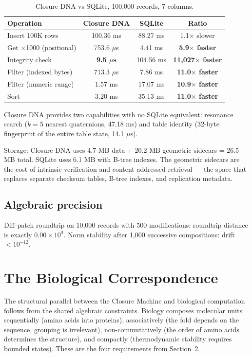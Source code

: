 \documentclass[12pt,a4paper]{article}
\begin{document}
\begin{table}[h]
\centering
\small
\begin{tabular}{@{}lccc@{}}
\toprule
Operation & Closure DNA & SQLite & Ratio \\
\midrule
Insert 100K rows & 100.36 ms & 88.27 ms & 1.1$\times$ slower \\
Get $\times$1000 (positional) & 753.6 $\mu$s & 4.41 ms & \textbf{5.9$\times$ faster} \\
Integrity check & \textbf{9.5 $\mu$s} & 104.56 ms & \textbf{11,027$\times$ faster} \\
Filter (indexed bytes) & 713.3 $\mu$s & 7.86 ms & \textbf{11.0$\times$ faster} \\
Filter (numeric range) & 1.57 ms & 17.07 ms & \textbf{10.9$\times$ faster} \\
Sort & 3.20 ms & 35.13 ms & \textbf{11.0$\times$ faster} \\
\bottomrule
\end{tabular}
\caption{Closure DNA vs SQLite, 100,000 records, 7 columns.}
\end{table}

Closure DNA provides two capabilities with no SQLite equivalent: resonance search ($k=5$ nearest quaternions, 47.18 ms) and table identity (32-byte fingerprint of the entire table state, 14.1 $\mu$s).

Storage: Closure DNA uses 4.7 MB data + 20.2 MB geometric sidecars = 26.5 MB total. SQLite uses 6.1 MB with B-tree indexes. The geometric sidecars are the cost of intrinsic verification and content-addressed retrieval --- the space that replaces separate checksum tables, B-tree indexes, and replication metadata.

\subsection{Algebraic precision}

Diff-patch roundtrip on 10,000 records with 500 modifications: roundtrip distance is exactly $0.00 \times 10^0$. Norm stability after 1,000 successive compositions: drift $< 10^{-12}$.


\section{The Biological Correspondence}

The structural parallel between the Closure Machine and biological computation follows from the shared algebraic constraints. Biology composes molecular units sequentially (amino acids into proteins), associatively (the fold depends on the sequence, grouping is irrelevant), non-commutatively (the order of amino acids determines the structure), and compactly (thermodynamic stability requires bounded states). These are the four requirements from Section~2.
\end{document}
